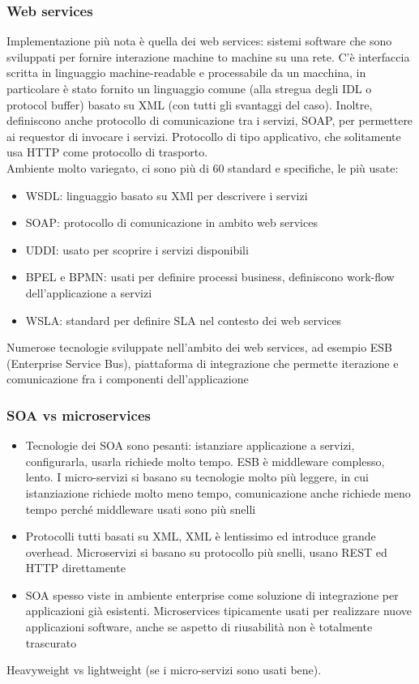\documentclass{article}
\begin{document}
\subsubsection{Web services}
Implementazione più nota è quella dei web services: sistemi software che sono sviluppati per fornire interazione machine to machine su una rete. C'è interfaccia scritta in linguaggio machine-readable e processabile da un macchina, in particolare è stato fornito un linguaggio comune (alla stregua degli IDL o protocol buffer) basato su XML (con tutti gli svantaggi del caso). Inoltre, definiscono anche protocollo di comunicazione tra i servizi, SOAP, per permettere ai requestor di invocare i servizi. Protocollo di tipo applicativo, che solitamente usa HTTP come protocollo di trasporto.\\ Ambiente molto variegato, ci sono più di 60 standard e specifiche, le più usate:
\begin{itemize}
\item WSDL: linguaggio basato su XMl per descrivere i servizi
\item SOAP: protocollo di comunicazione in ambito web services
\item UDDI: usato per scoprire i servizi disponibili
\item BPEL e BPMN: usati per definire processi business, definiscono work-flow dell'applicazione a servizi
\item WSLA: standard per definire SLA nel contesto dei web services
\end{itemize}
Numerose tecnologie sviluppate nell'ambito dei web services, ad esempio ESB (Enterprise Service Bus), piattaforma di integrazione che permette iterazione e comunicazione fra i componenti dell'applicazione
\subsubsection{SOA vs microservices}
\begin{itemize}
\item Tecnologie dei SOA sono pesanti: istanziare applicazione a servizi, configurarla, usarla richiede molto tempo. ESB è middleware complesso, lento. I micro-servizi si basano su tecnologie molto più leggere, in cui istanziazione richiede molto meno tempo, comunicazione anche richiede meno tempo perché middleware usati sono più snelli
\item Protocolli tutti basati su XML, XML è lentissimo ed introduce grande overhead. Microservizi si basano su protocollo più snelli, usano REST ed HTTP direttamente
\item SOA spesso viste in ambiente enterprise come soluzione di integrazione per applicazioni già esistenti. Microservices tipicamente usati per realizzare nuove applicazioni software, anche se aspetto di riusabilità non è totalmente trascurato
\end{itemize}
Heavyweight vs lightweight (se i micro-servizi sono usati bene).
\end{document}
